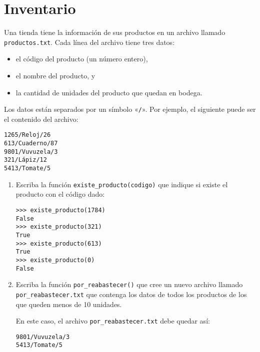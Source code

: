 \section{Inventario}

Una tienda tiene la información de sus productos en un archivo llamado
\lstinline!productos.txt!. Cada línea del archivo tiene tres datos:

\begin{itemize}
  \item el código del producto (un número entero),
  \item el nombre del producto, y
  \item la cantidad de unidades del producto que quedan en bodega.
\end{itemize}

Los datos están separados por un símbolo «\lstinline!/!». Por ejemplo, el
siguiente puede ser el contenido del archivo:

\begin{lstlisting}[language=file]
1265/Reloj/26
613/Cuaderno/87
9801/Vuvuzela/3
321/Lápiz/12
5413/Tomate/5
\end{lstlisting}

\begin{enumerate}
\item
  Escriba la función \lstinline!existe_producto(codigo)! que indique si
  existe el producto con el código dado:

\begin{lstlisting}
>>> existe_producto(1784)
False
>>> existe_producto(321)
True
>>> existe_producto(613)
True
>>> existe_producto(0)
False
\end{lstlisting}
\item
  Escriba la función \lstinline!por_reabastecer()! que cree un nuevo
  archivo llamado \lstinline!por_reabastecer.txt! que contenga los datos
  de todos los productos de los que queden menos de 10 unidades.

  En este caso, el archivo \lstinline!por_reabastecer.txt! debe quedar
  así:
\begin{lstlisting}[language=file]
9801/Vuvuzela/3
5413/Tomate/5
\end{lstlisting}

\end{enumerate}
